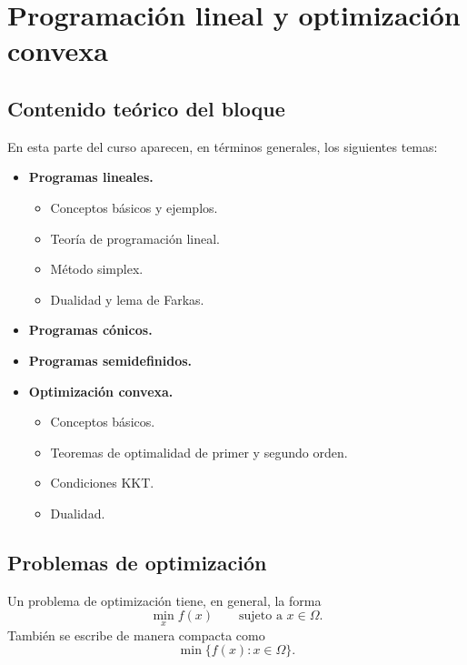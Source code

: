 
\section{Programación lineal y optimización convexa}

\subsection{Contenido teórico del bloque}

En esta parte del curso aparecen, en términos generales, los siguientes temas:

\begin{itemize}
    \item \textbf{Programas lineales.}
    \begin{itemize}
        \item Conceptos básicos y ejemplos.
        \item Teoría de programación lineal.
        \item Método simplex.
        \item Dualidad y lema de Farkas.
    \end{itemize}

    \item \textbf{Programas cónicos.}

    \item \textbf{Programas semidefinidos.}

    \item \textbf{Optimización convexa.}
    \begin{itemize}
        \item Conceptos básicos.
        \item Teoremas de optimalidad de primer y segundo orden.
        \item Condiciones KKT.
        \item Dualidad.
    \end{itemize}
\end{itemize}

\subsection{Problemas de optimización}

Un problema de optimización tiene, en general, la forma
\[
    \min_{x} f(x)
    \qquad \text{sujeto a } x\in \Omega.
\]
También se escribe de manera compacta como
\[
    \min\{f(x):x\in \Omega\}.
\]

